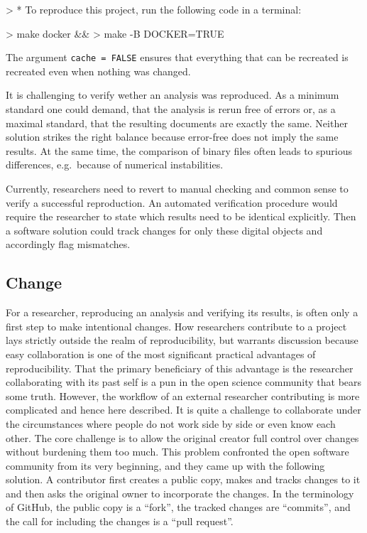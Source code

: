 \documentclass[12pt,a4paper,twoside]{article}
\let\oldverbatim\verbatim
\let\endoldverbatim\endverbatim
\renewenvironment{verbatim}{\footnotesize\oldverbatim}{\endoldverbatim}
\begin{document}
\begin{verbatim}
> * To reproduce this project, run the following code in a terminal:
\end{verbatim}

\begin{verbatim}
>   make docker &&
>   make -B DOCKER=TRUE
\end{verbatim}

The argument \texttt{cache\ =\ FALSE} ensures that everything that can be recreated is recreated even when nothing was changed.

It is challenging to verify wether an analysis was reproduced.
As a minimum standard one could demand, that the analysis is rerun free of errors or, as a maximal standard, that the resulting documents are exactly the same.
Neither solution strikes the right balance because error-free does not imply the same results.
At the same time, the comparison of binary files often leads to spurious differences, e.g.~because of numerical instabilities.

Currently, researchers need to revert to manual checking and common sense to verify a successful reproduction.
An automated verification procedure would require the researcher to state which results need to be identical explicitly.
Then a software solution could track changes for only these digital objects and accordingly flag mismatches.

\hypertarget{change}{%
\subsection{Change}\label{change}}

For a researcher, reproducing an analysis and verifying its results, is often only a first step to make intentional changes.
How researchers contribute to a project lays strictly outside the realm of reproducibility, but warrants discussion because easy collaboration is one of the most significant practical advantages of reproducibility.
That the primary beneficiary of this advantage is the researcher collaborating with its past self is a pun in the open science community that bears some truth.
However, the workflow of an external researcher contributing is more complicated and hence here described.
It is quite a challenge to collaborate under the circumstances where people do not work side by side or even know each other.
The core challenge is to allow the original creator full control over changes without burdening them too much.
This problem confronted the open software community from its very beginning, and they came up with the following solution.
A contributor first creates a public copy, makes and tracks changes to it and then asks the original owner to incorporate the changes.
In the terminology of GitHub, the public copy is a ``fork'', the tracked changes are ``commits'', and the call for including the changes is a ``pull request''.
\end{document}
